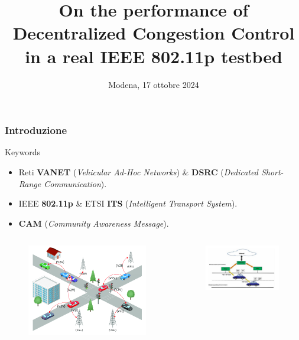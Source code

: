 \documentclass{beamer}
\title[DCC performance in IEEE 802.11p] %
{On the performance of Decentralized Congestion Control in a real IEEE 802.11p testbed}
\institute[] %
{
    \fontsize{11}{13}\selectfont \textbf{Relatore: Prof. Carlo Augusto Grazia}
    \and
    Corso di Laurea Magistrale in Ingegneria Informatica\\
    Percorso "\textit{Cloud \& Cybersecurity}"\\
    Esame di Automotive Connectivity
    \and
    Dipartimento di Ingegneria "Enzo Ferrari"\\
    Università degli studi di Modena e Reggio Emilia
}
\date[17 ottobre 2024] %
{Modena, 17 ottobre 2024}
\begin{document}
\frame{\titlepage}

\begin{frame}
\frametitle{Introduzione}
\centering
\begin{block}{Keywords}
    \begin{itemize}
        \item Reti \textbf{VANET} (\textit{Vehicular Ad-Hoc Networks}) \& \textbf{DSRC} (\textit{Dedicated Short-Range Communication}).
        \item IEEE \textbf{802.11p} \& ETSI \textbf{ITS} (\textit{Intelligent Transport System}).
        \item \textbf{CAM} (\textit{Community Awareness Message}).
    \end{itemize}
\end{block}

\begin{columns}
    \begin{column}{0.5\textwidth}
        \begin{figure}[h!]
            \centering
            \includegraphics[width=1\textwidth]{vanet.png}
            \label{fig:vanet}
        \end{figure}
    \end{column}
    \begin{column}{0.5\textwidth}
        \begin{figure}[h!]
            \centering
            \includegraphics[width=1\textwidth]{routing_vanet.jpeg}

\end{figure}
\end{column}
\end{columns}
\end{frame}
\end{document}
